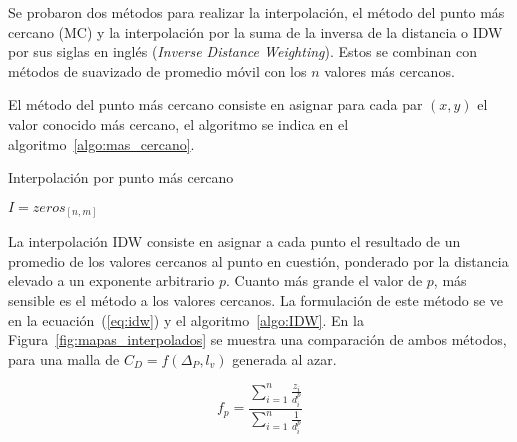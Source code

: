 Se probaron dos métodos para realizar la interpolación, el método del punto más
cercano (MC) y la interpolación por la suma de la inversa de la distancia o IDW por
sus siglas en inglés (\emph{Inverse Distance Weighting}).
%
Estos se combinan con métodos de suavizado de promedio móvil con los $n$ valores
más cercanos.

El método del punto más cercano consiste en asignar para cada par $(x, y)$ el
valor conocido más cercano, el algoritmo se indica en el
algoritmo~\ref{algo:mas_cercano}.

\begin{algorithm}
 \caption{Interpolación por punto más cercano}\label{algo:mas_cercano}


    \BlankLine
     $I=zeros_{[n,m]}$\;
\end{algorithm}

La interpolación IDW consiste en asignar a cada punto el resultado de un
promedio de los valores cercanos al punto en cuestión, ponderado por la
distancia elevado a un exponente arbitrario $p$.
%
Cuanto más grande el valor de $p$, más sensible es el método a los valores
cercanos.
%
La formulación de este método se ve en la ecuación~(\ref{eq:idw}) y el
algoritmo~\ref{algo:IDW}.
%
En la Figura~\ref{fig:mapas_interpolados} se muestra una comparación de ambos
métodos, para una malla de $C_{D}=f(\Delta_{P}, l_{v})$ generada al azar.

\begin{equation} \label{eq:idw}
    f_p = \frac{\sum_{i=1}^{n} \frac{z_i}{d_i^p}} {\sum_{i=1}^{n}
    \frac{1}{d_i^p}}
\end{equation}

